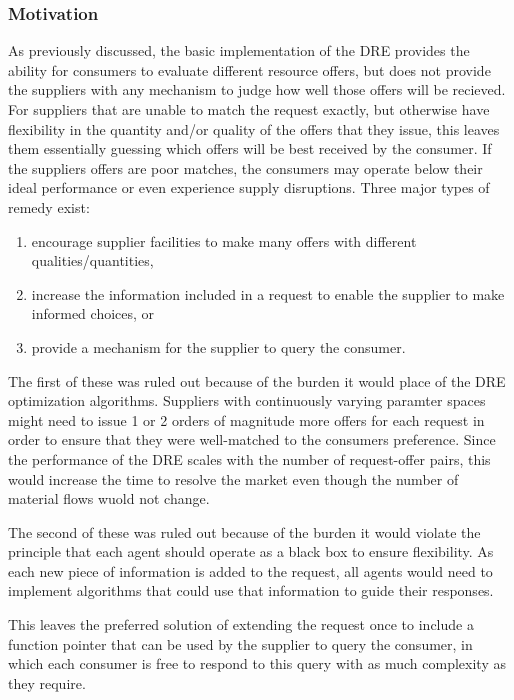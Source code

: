 \subsubsection{Motivation}

As previously discussed, the basic implementation of the \gls{DRE} provides
the ability for consumers to evaluate different resource offers, but does not
provide the suppliers with any mechanism to judge how well those offers will
be recieved.  For suppliers that are unable to match the request exactly, but
otherwise have flexibility in the quantity and/or quality of the offers that
they issue, this leaves them essentially guessing which offers will be best
received by the consumer.  If the suppliers offers are poor matches, the
consumers may operate below their ideal performance or even experience supply
disruptions.  Three major types of remedy exist:
\begin{enumerate}
\item encourage supplier facilities to make many offers with different
  qualities/quantities,
\item increase the information included in a request to enable the supplier to
  make informed choices, or
\item provide a mechanism for the supplier to query the consumer.
\end{enumerate}

The first of these was ruled out because of the burden it would place of the
\gls{DRE} optimization algorithms.  Suppliers with continuously varying
paramter spaces might need to issue 1 or 2 orders of magnitude more offers for
each request in order to ensure that they were well-matched to the consumers
preference.  Since the performance of the \gls{DRE} scales with the number of
request-offer pairs, this would increase the time to resolve the market even
though the number of material flows wuold not change.

The second of these was ruled out because of the burden it would violate the
\Cyclus{} principle that each agent should operate as a black box to ensure
flexibility.  As each new piece of information is added to the request, all
agents would need to implement algorithms that could use that information to
guide their responses.  

This leaves the preferred solution of extending the request once to include a
function pointer that can be used by the supplier to query the consumer, in
which each consumer is free to respond to this query with as much complexity
as they require.


